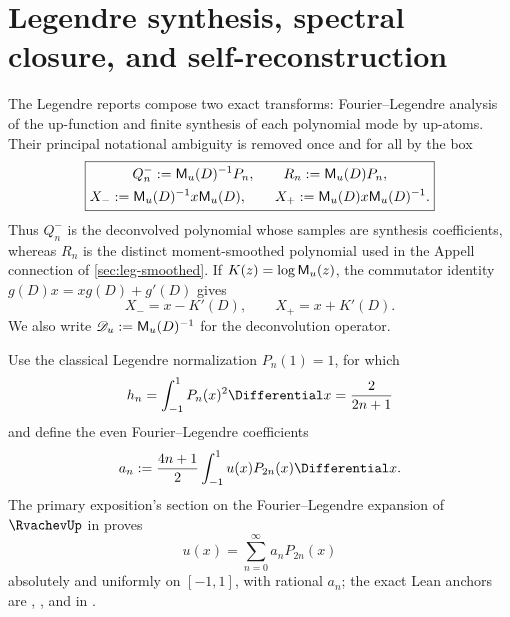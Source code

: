 
\section{Legendre synthesis, spectral closure, and self-reconstruction}
\label{sec:legendre-closure}

The Legendre reports compose two exact transforms: Fourier--Legendre analysis
of the up-function and finite synthesis of each polynomial mode by up-atoms.
Their principal notational ambiguity is removed once and for all by the box
\begin{equation}
 \boxed{
 \begin{gathered}
 Q_n^-:=\mathsf M_u(D)^{-1}P_n,\qquad
 R_n:=\mathsf M_u(D)P_n,\\
 X_-:=\mathsf M_u(D)^{-1}x\mathsf M_u(D),\qquad
 X_+:=\mathsf M_u(D)x\mathsf M_u(D)^{-1}.
 \end{gathered}}
 \label{eq:leg-notation}
\end{equation}
Thus $Q_n^-$ is the deconvolved polynomial whose samples are synthesis
coefficients, whereas $R_n$ is the distinct moment-smoothed polynomial used
in the Appell connection of \cref{sec:leg-smoothed}.  If
$K(z)=\log\mathsf M_u(z)$, the commutator identity
$g(D)x=xg(D)+g'(D)$ gives
\begin{equation}
 X_-=x-K'(D),\qquad X_+=x+K'(D).
 \label{eq:leg-Xpm}
\end{equation}
We also write $\mathscr D_u:=\mathsf M_u(D)^{-1}$ for the deconvolution operator.

Use the classical Legendre normalization $P_n(1)=1$, for which
\begin{equation}
 h_n=\int_{-1}^{1}P_n(x)^2\Differential x=\frac2{2n+1}
 \label{eq:leg-hn}
\end{equation}
and define the even Fourier--Legendre coefficients
\begin{equation}
 a_n:=\frac{4n+1}{2}\int_{-1}^{1}u(x)P_{2n}(x)\Differential x.
 \label{eq:leg-an}
\end{equation}
The primary exposition's section on the Fourier--Legendre expansion of
$\RvachevUp$ in  proves
\begin{equation}
 u(x)=\sum_{n=0}^{\infty}a_nP_{2n}(x)
 \label{eq:leg-canonical-series}
\end{equation}
absolutely and uniformly on $[-1,1]$, with rational $a_n$; the exact Lean
anchors are ,
, and
 in
.


